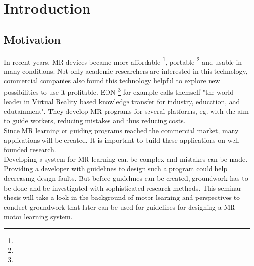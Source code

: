 \chapter{Introduction}

\section{Motivation}
In recent years, MR devices became more affordable \footnote{\todo}, portable \footnote{\todo} and usable in many conditions. Not only academic researchers are interested in this technology, commercial companies also found this technology helpful to explore new possibilities to use it profitable. EON \footnote{\todo} for example calls themself "the world leader in Virtual Reality based knowledge transfer for industry, education, and edutainment". They develop MR programs for several platforms, eg. with the aim to guide workers, reducing mistakes and thus reducing costs.\\
Since MR learning or guiding programs reached the commercial market, many applications will be created. It is important to build these applications on well founded research.\\
Developing a system for MR learning can be complex and mistakes can be made. Providing a developer with guidelines to design such a program could help decreasing design faults. But before guidelines can be created, groundwork has to be done and be investigated with sophisticated research methods.
This seminar thesis will take a look in the background of motor learning and perspectives to conduct groundwork that later can be used for guidelines for designing a MR motor learning system.

